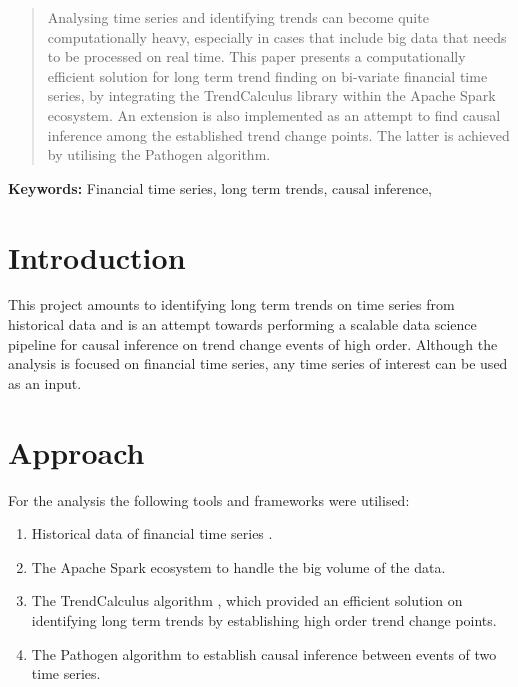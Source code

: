 \documentclass[a4, 11pt]{article}
\begin{document}
\newpage
\begin{abstract}
    Analysing time series and identifying trends can become quite computationally heavy, especially in cases that include big data that needs to be processed on real time. This paper presents a computationally efficient solution for long term trend finding on bi-variate financial time series, by integrating the TrendCalculus library within the Apache Spark ecosystem. An extension is also implemented as an attempt to find causal inference among the established trend change points. The latter is achieved by utilising the Pathogen algorithm. 
    
\end{abstract}
\begin{center}
    \textbf{Keywords:} Financial time series, long term trends, causal inference, 
\end{center}
\setcounter{page}{2}
\newpage


\tableofcontents
\newpage


\section{Introduction}
This project amounts to identifying long term trends on time series from historical data and is an attempt towards performing a scalable data science pipeline for causal inference on trend change events of high order. Although the analysis is focused on financial time series, any time series of interest can be used as an input. 


\section{Approach}
For the analysis the following tools and frameworks were utilised:
    \begin{enumerate}
        \item Historical data of financial time series \cite{HistData}.
        \item The Apache Spark ecosystem \cite{Spark} to handle the big volume of the data. 
        \item The TrendCalculus algorithm \cite{TrendCalculus}, which provided an efficient solution on identifying long term trends by establishing high order trend change points.
        \item The Pathogen algorithm \cite{Pathogen} to establish causal inference between events of two time series. 
    \end{enumerate}
    
\end{document}
